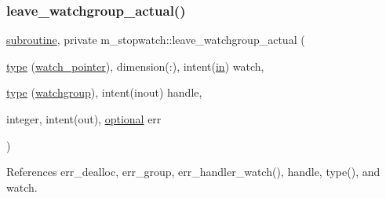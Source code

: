 \subsubsection{\texorpdfstring{leave\+\_\+watchgroup\+\_\+actual()}{leave\_watchgroup\_actual()}}
{\footnotesize\ttfamily \hyperlink{M__stopwatch_83_8txt_acfbcff50169d691ff02d4a123ed70482}{subroutine}, private m\+\_\+stopwatch\+::leave\+\_\+watchgroup\+\_\+actual (\begin{DoxyParamCaption}\item[{\hyperlink{stop__watch_83_8txt_a70f0ead91c32e25323c03265aa302c1c}{type} (\hyperlink{structm__stopwatch_1_1watch__pointer}{watch\+\_\+pointer}), dimension(\+:), intent(\hyperlink{M__journal_83_8txt_afce72651d1eed785a2132bee863b2f38}{in})}]{watch,  }\item[{\hyperlink{stop__watch_83_8txt_a70f0ead91c32e25323c03265aa302c1c}{type} (\hyperlink{structm__stopwatch_1_1watchgroup}{watchgroup}), intent(inout)}]{handle,  }\item[{integer, intent(out), \hyperlink{option__stopwatch_83_8txt_aa4ece75e7acf58a4843f70fe18c3ade5}{optional}}]{err }\end{DoxyParamCaption})\hspace{0.3cm}{\ttfamily [private]}}



References err\+\_\+dealloc, err\+\_\+group, err\+\_\+handler\+\_\+watch(), handle, type(), and watch.


